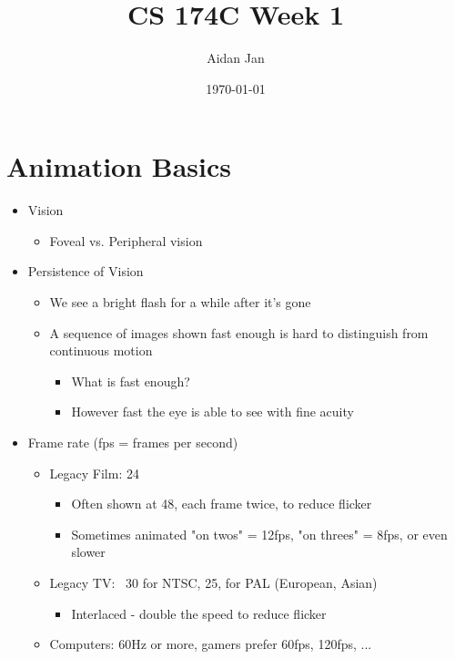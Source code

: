 \documentclass{article}
\title{CS 174C Week 1}
\author{Aidan Jan}
\date{\today}
\begin{document}
\maketitle
\section*{Animation Basics}
\begin{itemize}
    \item Vision
        \begin{itemize}
            \item Foveal vs. Peripheral vision
        \end{itemize}
    \item Persistence of Vision
        \begin{itemize}
            \item We see a bright flash for a while after it's gone
            \item A sequence of images shown fast enough is hard to distinguish from continuous motion
                \begin{itemize}
                    \item What is fast enough?
                    \item However fast the eye is able to see with fine acuity
                \end{itemize}
        \end{itemize}
    \item Frame rate (fps = frames per second)
        \begin{itemize}
            \item Legacy Film: 24
                \begin{itemize}
                    \item Often shown at 48, each frame twice, to reduce flicker
                    \item Sometimes animated "on twos" = 12fps, "on threes" = 8fps, or even slower
                \end{itemize}
            \item Legacy TV: ~30 for NTSC, 25, for PAL (European, Asian)
                \begin{itemize}
                    \item Interlaced - double the speed to reduce flicker
                \end{itemize}
            \item Computers: 60Hz or more, gamers prefer 60fps, 120fps, ...
        \end{itemize}
\end{itemize}
\end{document}
